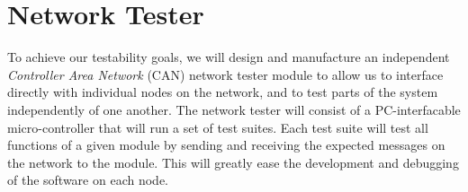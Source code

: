 \section{Network Tester}

To achieve our testability goals, we will design and manufacture an independent \emph{Controller Area Network} (CAN) network tester module to allow us to interface directly with individual nodes on the network, and to test parts of the system independently of one another. The network tester will consist of a PC-interfacable micro-controller that will run a set of test suites. Each test suite will test all functions of a given module by sending and receiving the expected messages on the network to the module. This will greatly ease the development and debugging of the software on each node.
